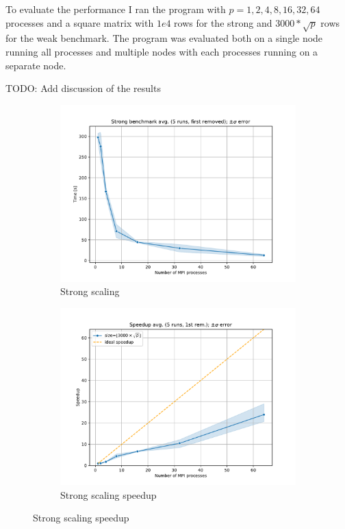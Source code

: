 \documentclass[unicode,11pt,a4paper,oneside,numbers=endperiod,openany]{scrartcl}
\begin{document}
To evaluate the performance I ran the program with $p = 1, 2, 4, 8, 16, 32, 64$ processes and a square matrix with $1e4$ rows for the strong and $3000 * \sqrt{p}$ rows for the weak benchmark. The program was evaluated both on a single node running all processes and multiple nodes with each processes running on a separate node.

TODO: Add discussion of the results


\begin{figure}
      \begin{subfigure}{.5\textwidth}
            \centering
            \includegraphics[width=1\linewidth]{plots/power_strong_scaling.pdf}
            \caption{Strong scaling}
            \label{fig:powermethod_strong}
      \end{subfigure}
      \begin{subfigure}{.5\textwidth}
            \centering
            \includegraphics[width=1\linewidth]{plots/power_strong_speedup.pdf}
            \caption{Strong scaling speedup}
            \label{fig:powermethod_speedup}
      \end{subfigure}
\end{figure}
\end{document}
